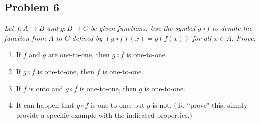 \documentclass{article}
\begin{document}
\subsection*{Problem 6}
{\it Let $f \colon A \to B$ and $g \colon B \to C$ be given functions.
Use the symbol $g \circ f$ to denote the function from $A$ to $C$
defined by $(g \circ f)(x) = g\left(f(x)\right)$ for all $x \in A$. Prove:
\begin{enumerate}
	\item If $f$ and $g$ are one-to-one, then $g \circ f$ is one-to-one.
	\item If $g \circ f$ is one-to-one, then $f$ is one-to-one.
	\item If $f$ is onto and $g \circ f$ is one-to-one, then $g$ is one-to-one.
	\item It can happen that $g \circ f$ is one-to-one, but $g$ is not.
	(To ``prove" this, simply provide a specific example with the indicated properties.)
\end{enumerate}}
\end{document}
